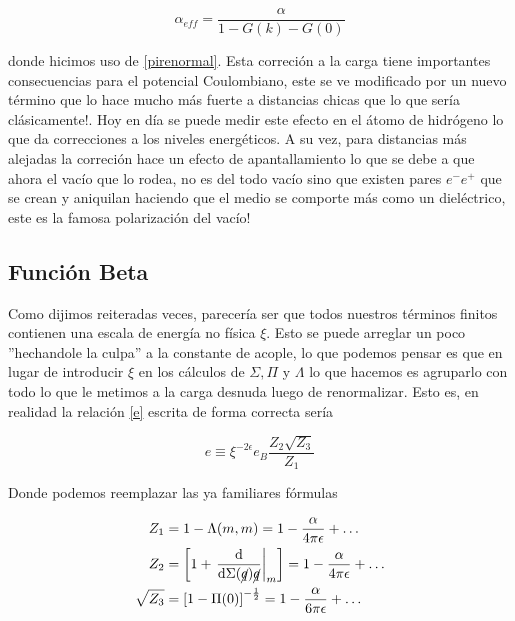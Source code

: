 \documentclass[tickz]{article}
\numberwithin{equation}{section}
\begin{document}
\begin{equation}\label{key}
\alpha_{eff} = \frac{\alpha}{1- G(k) - G(0)}
\end{equation} 

donde hicimos uso de \ref{pirenormal}. Esta correción a la carga tiene importantes consecuencias para el potencial Coulombiano, este se ve modificado por un nuevo término que lo hace mucho más fuerte a distancias chicas que lo que sería clásicamente!. Hoy en día se puede medir este efecto en el átomo de hidrógeno lo que da correcciones a los niveles energéticos. A su vez, para distancias más alejadas la correción hace un efecto de apantallamiento lo que se debe a que ahora el vacío que lo rodea, no es del todo vacío sino que existen pares $ e^{-}e^{+} $ que se crean y aniquilan haciendo que el medio se comporte más como un dieléctrico, este es la famosa polarización del vacío!


\subsection{Función Beta}

Como dijimos reiteradas veces, parecería ser que todos nuestros términos finitos contienen una escala de energía no física $ \xi $. Esto se puede arreglar un poco ''hechandole la culpa'' a la constante de acople, lo que podemos pensar es que en lugar de introducir $ \xi $ en los cálculos de $ \Sigma, \Pi $ y $ \Lambda $ lo que hacemos es agruparlo con todo lo que le metimos a la carga desnuda luego de renormalizar. Esto es, en realidad la relación \ref{e} escrita de forma correcta sería

\begin{equation}\label{exi}
e \equiv \xi^{-2\epsilon} e_B\frac{Z_2 \sqrt{Z_3}}{Z_1}
\end{equation}

Donde podemos reemplazar las ya familiares fórmulas

\begin{equation}\label{key}
\begin{aligned}
Z_1 &= 1- \Lambda(m,m) = 1 -\frac{\alpha}{4\pi \epsilon} + \dots\\
Z_2 &= \left[1 + \left.\frac{\mathrm{d}}{\mathrm{d\Sigma(\cancel{q})}\cancel{q}}\right|_m \right] = 1 -\frac{\alpha}{4\pi \epsilon} + \dots\\
\sqrt{Z_3} &= \left[1 - \Pi(0)\right]^{-\frac{1}{2}} = 1 -\frac{\alpha}{6\pi \epsilon} + \dots
\end{aligned}
\end{equation}
\end{document}
